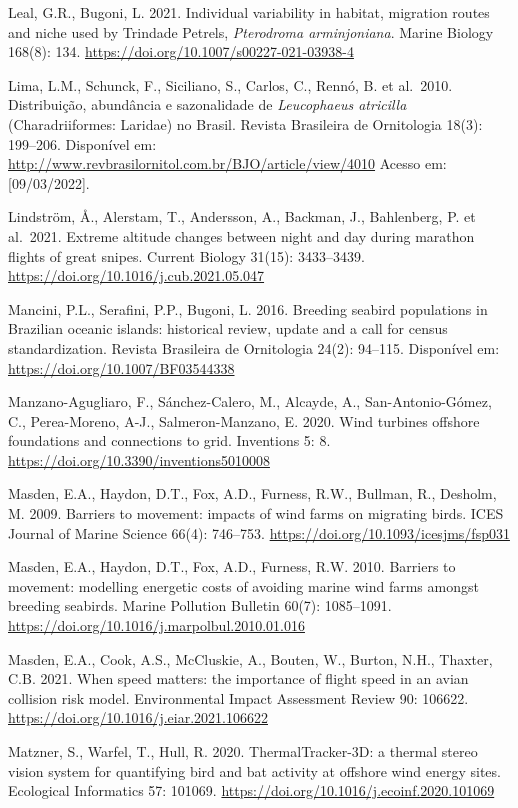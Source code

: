 \documentclass[
  oneside]{scrbook}
\begin{document}
Leal, G.R., Bugoni, L. 2021. Individual variability in habitat, migration routes and niche used by Trindade Petrels, \emph{Pterodroma arminjoniana}. Marine Biology 168(8): 134. \url{https://doi.org/10.1007/s00227-021-03938-4}

Lima, L.M., Schunck, F., Siciliano, S., Carlos, C., Rennó, B. et al.~2010. Distribuição, abundância e sazonalidade de \emph{Leucophaeus atricilla} (Charadriiformes: Laridae) no Brasil. Revista Brasileira de Ornitologia 18(3): 199--206. Disponível em: \url{http://www.revbrasilornitol.com.br/BJO/article/view/4010} Acesso em:{[}09/03/2022{]}.

Lindström, Å., Alerstam, T., Andersson, A., Backman, J., Bahlenberg, P. et al.~2021. Extreme altitude changes between night and day during marathon flights of great snipes. Current Biology 31(15): 3433--3439. \url{https://doi.org/10.1016/j.cub.2021.05.047}

Mancini, P.L., Serafini, P.P., Bugoni, L. 2016. Breeding seabird populations in Brazilian oceanic islands: historical review, update and a call for census standardization. Revista Brasileira de Ornitologia 24(2): 94--115. Disponível em: \url{https://doi.org/10.1007/BF03544338}

Manzano-Agugliaro, F., Sánchez-Calero, M., Alcayde, A., San-Antonio-Gómez, C., Perea-Moreno, A-J., Salmeron-Manzano, E. 2020. Wind turbines offshore foundations and connections to grid. Inventions 5: 8. \url{https://doi.org/10.3390/inventions5010008}

Masden, E.A., Haydon, D.T., Fox, A.D., Furness, R.W., Bullman, R., Desholm, M. 2009. Barriers to movement: impacts of wind farms on migrating birds. ICES Journal of Marine Science 66(4): 746--753. \url{https://doi.org/10.1093/icesjms/fsp031}

Masden, E.A., Haydon, D.T., Fox, A.D., Furness, R.W. 2010. Barriers to movement: modelling energetic costs of avoiding marine wind farms amongst breeding seabirds. Marine Pollution Bulletin 60(7): 1085--1091. \url{https://doi.org/10.1016/j.marpolbul.2010.01.016}

Masden, E.A., Cook, A.S., McCluskie, A., Bouten, W., Burton, N.H., Thaxter, C.B. 2021. When speed matters: the importance of flight speed in an avian collision risk model. Environmental Impact Assessment Review 90: 106622. \url{https://doi.org/10.1016/j.eiar.2021.106622}

Matzner, S., Warfel, T., Hull, R. 2020. ThermalTracker-3D: a thermal stereo vision system for quantifying bird and bat activity at offshore wind energy sites. Ecological Informatics 57: 101069. \url{https://doi.org/10.1016/j.ecoinf.2020.101069}
\end{document}
